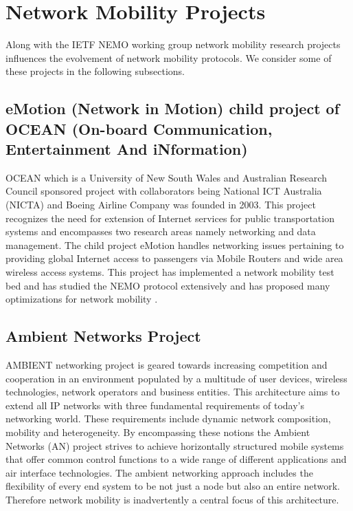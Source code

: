 \section{Network Mobility Projects}

Along with the IETF NEMO working group network mobility research projects
influences the evolvement of network mobility protocols. We consider some of
these projects in the following subsections.

\subsection{eMotion (Network in Motion) child project of OCEAN (On-board
Communication, Entertainment And iNformation)}

OCEAN \cite{42} which is a University of New South Wales and Australian
Research Council sponsored project with collaborators being National ICT
Australia (NICTA) \cite{43} and Boeing Airline Company was founded in 2003.
This project recognizes the need for extension of Internet services for public
transportation systems and encompasses two research areas namely networking
and data management. The child project eMotion \cite{44} handles networking
issues pertaining to providing global Internet access to passengers via Mobile
Routers and wide area wireless access systems. This project has implemented a
network mobility test bed \cite{45} and has studied the NEMO protocol extensively and
has proposed many optimizations for network mobility \cite{16}.

\subsection{Ambient Networks Project}

AMBIENT networking project \cite{21} is geared towards increasing competition and cooperation in an environment populated by a multitude of user devices, wireless technologies, network operators and business entities. This architecture aims to extend all IP networks with three fundamental requirements of today's networking world. These requirements include dynamic network composition, mobility and heterogeneity.  By encompassing these notions the Ambient Networks (AN) project strives to achieve horizontally structured mobile systems that offer common control functions to a wide range of different applications and air interface technologies. The ambient networking approach includes the flexibility of every end system to be not just a node but also an entire network. Therefore network mobility is inadvertently a central focus of this architecture.

